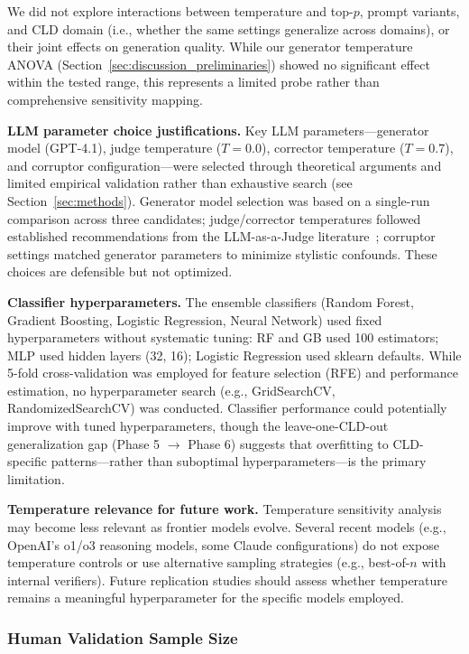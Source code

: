 We did not explore interactions between temperature and top-$p$, prompt variants, and CLD domain (i.e., whether the same settings generalize across domains), or their joint effects on generation quality. While our generator temperature ANOVA (Section~\ref{sec:discussion_preliminaries}) showed no significant effect within the tested range, this represents a limited probe rather than comprehensive sensitivity mapping.

\textbf{LLM parameter choice justifications.} Key LLM parameters---generator model (GPT-4.1), judge temperature ($T=0.0$), corrector temperature ($T=0.7$), and corruptor configuration---were selected through theoretical arguments and limited empirical validation rather than exhaustive search (see Section~\ref{sec:methods}). Generator model selection was based on a single-run comparison across three candidates; judge/corrector temperatures followed established recommendations from the LLM-as-a-Judge literature~\citep{liu2023gevalnlgevaluationusing, zheng2024judging, madaan2023selfrefineiterativerefinementselffeedback}; corruptor settings matched generator parameters to minimize stylistic confounds. These choices are defensible but not optimized.

\textbf{Classifier hyperparameters.} The ensemble classifiers (Random Forest, Gradient Boosting, Logistic Regression, Neural Network) used fixed hyperparameters without systematic tuning: RF and GB used 100 estimators; MLP used hidden layers (32, 16); Logistic Regression used sklearn defaults. While 5-fold cross-validation was employed for feature selection (RFE) and performance estimation, no hyperparameter search (e.g., GridSearchCV, RandomizedSearchCV) was conducted. Classifier performance could potentially improve with tuned hyperparameters, though the leave-one-CLD-out generalization gap (Phase 5 $\rightarrow$ Phase 6) suggests that overfitting to CLD-specific patterns---rather than suboptimal hyperparameters---is the primary limitation.

\textbf{Temperature relevance for future work.} Temperature sensitivity analysis may become less relevant as frontier models evolve. Several recent models (e.g., OpenAI's o1/o3 reasoning models, some Claude configurations) do not expose temperature controls or use alternative sampling strategies (e.g., best-of-$n$ with internal verifiers). Future replication studies should assess whether temperature remains a meaningful hyperparameter for the specific models employed.

\subsubsection{Human Validation Sample Size}

